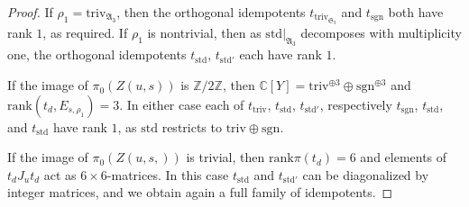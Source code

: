 \documentclass[10pt,a4paper]{amsart}
\newcommand{\An}{\mathfrak{A}}
\newcommand{\C}{\mathbb{C}}
\newcommand{\Sn}{\mathfrak{S}}
\newcommand{\Z}{\mathbb{Z}}
\newcommand{\sgn}{\mathrm{sgn}}
\newcommand{\std}{\mathrm{std}}
\newcommand{\triv}{\mathrm{triv}}
\begin{document}
\begin{proof}
If $\rho_1=\triv_{\An_3}$, then the orthogonal idempotents $t_{\triv_{\Sn_3}}$ and $t_{\sgn}$ both have rank $1$, as required. If $\rho_1$ is nontrivial, then as $\std|_{\An_3}$ decomposes with multiplicity one, the orthogonal idempotents $t_{\std}$, $t_{\std'}$ each have rank $1$.

If the image of $\pi_0(Z(u,s))$ is $\Z/2\Z$, then $\C[Y]=\triv^{\oplus 3}\oplus\sgn^{\oplus 3}$ and $\mathrm{rank}(
t_d, E_{s,\rho_1})=3$.
In either case each of $t_{\triv}$, $t_{\std}$, $t_{\std'}$, respectively $t_{\sgn}$, $t_{\std}$, and $t_{\std}$ have rank $1$, as $\std$ restricts to $\triv\oplus\sgn$.

If the image of $\pi_0(Z(u,s,))$ is trivial, then $\mathrm{rank}\pi(t_d)=6$ and elements of $t_dJ_ut_d$ act as $6\times 6$-matrices. In this case $t_{\std}$ and $t_{\std'}$ can be diagonalized by integer matrices, and we obtain again a full family of idempotents.
%
\end{proof}
\end{document}

